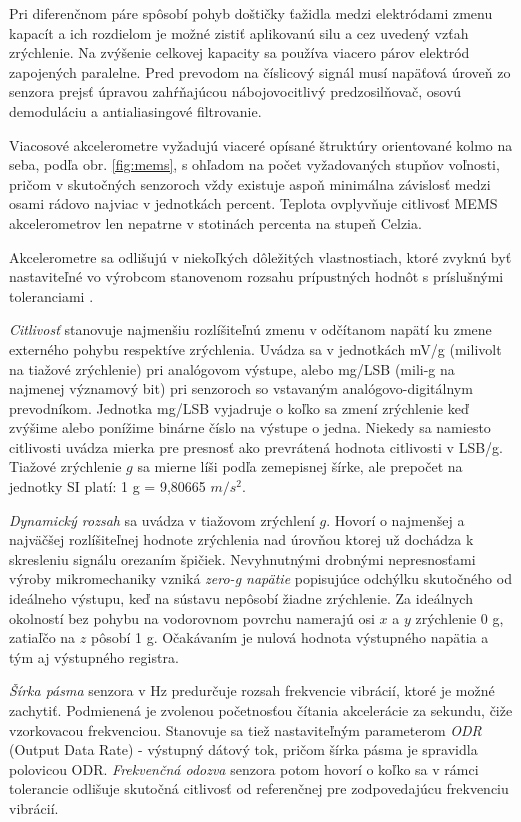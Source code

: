 Pri diferenčnom páre spôsobí pohyb doštičky ťažidla medzi elektródami zmenu kapacít a ich rozdielom je možné zistiť aplikovanú silu a
cez uvedený vzťah zrýchlenie. Na zvýšenie celkovej kapacity sa používa viacero párov elektród zapojených paralelne. Pred prevodom na
číslicový signál musí napäťová úroveň zo senzora prejsť úpravou zahŕňajúcou nábojovocitlivý predzosilňovač, osovú demoduláciu a anti\-aliasingové filtrovanie.

Viacosové akcelerometre vyžadujú viaceré opísané štruktúry orientované kolmo na seba, podľa obr. \ref{fig:mems}, s ohľadom na počet
vyžadovaných stupňov voľnosti, pričom v skutočných senzoroch vždy existuje aspoň minimálna závislosť medzi osami rádovo najviac v
jednotkách percent. Teplota ovplyvňuje citlivosť MEMS akcelerometrov len nepatrne v stotinách percenta na stupeň Celzia.

Akcelerometre sa odlišujú v niekoľkých dôležitých vlastnostiach, ktoré zvyknú byť nastaviteľné vo výrobcom stanovenom rozsahu
prípustných hodnôt s príslušnými toleranciami \cite{accelerometer-mechanics}.

\emph{Citlivosť} stanovuje najmenšiu rozlíšiteľnú zmenu v odčítanom napätí ku zmene externého pohybu respektíve zrýchlenia.
Uvádza sa v jednotkách mV/g (milivolt na tiažové zrýchlenie) pri analógovom výstupe, alebo mg/LSB (mili-g
na najmenej významový bit) pri senzoroch so vstavaným analógovo-digitálnym prevodníkom. Jednotka mg/LSB vyjadruje
o koľko sa zmení zrýchlenie keď zvýšime alebo ponížime binárne číslo na výstupe o jedna. Niekedy sa namiesto
citlivosti uvádza mierka pre presnosť ako prevrátená hodnota citlivosti v LSB/g. Tiažové zrýchlenie $g$ sa mierne líši podľa
zemepisnej šírke, ale prepočet na jednotky SI platí: 1 g = 9,80665 $m/s^2$.

\emph{Dynamický rozsah} sa uvádza v tiažovom  zrýchlení $g$. Hovorí o najmenšej a najväčšej rozlíšiteľnej hodnote zrýchlenia nad
úrovňou ktorej už dochádza k skresleniu signálu orezaním špičiek. Nevyhnutnými drobnými nepresnosťami výroby mikromechaniky vzniká
\emph{zero-g napätie} popisujúce odchýlku skutočného od ideálneho výstupu, keď na sústavu nepôsobí žiadne zrýchlenie. Za ideálnych
okolností bez pohybu na vodorovnom povrchu namerajú osi $x$ a $y$ zrýchlenie 0 g, zatiaľčo na $z$ pôsobí 1 g. Očakávaním je nulová
hodnota výstupného napätia a tým aj výstupného registra.

\emph{Šírka pásma} senzora v Hz predurčuje rozsah frekvencie vibrácií, ktoré je možné zachytiť. Podmienená je zvolenou
početnosťou  čítania akcelerácie za sekundu, čiže vzorkovacou frekvenciou. Stanovuje sa tiež nastaviteľným parameterom \emph{ODR}
(Output Data Rate) - výstupný dátový tok, pričom šírka pásma je spravidla polovicou ODR. \emph{Frekvenčná odozva} senzora potom
hovorí o koľko sa v rámci tolerancie odlišuje skutočná citlivosť od referenčnej pre zodpovedajúcu frekvenciu vibrácií.

